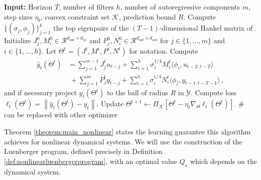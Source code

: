 \documentclass[11pt]{article}
\def\K{{\mathcal K}}
\def\R{{\mathcal R}}
\newcommand{\norm}[1]{\left\lVert#1\right\rVert}
\def\R{\ensuremath{\mathcal R}}
\numberwithin{equation}{section}
\begin{document}
\begin{algorithm}[htb]
\caption{Observation Spectral Filtering + Regression}
\label{alg:clsf_regressionmain}
\begin{algorithmic}[1]
\STATE \textbf{Input:} Horizon \(T\), number of filters \(h\), number of autoregressive components $m$, step sizes $\eta_t$, convex constraint set \(\K\), prediction bound $R$.
\STATE Compute $\{(\sigma_j, {\phi}_j)\}_{j=1}^k$ the top eigenpairs of the $(T-1)$-dimensional Hankel matrix of \cite{hazan2017learning}.
\STATE Initialize $J_j^0, M_i^0  \in \R^{d_{out} \times d_{in}}$ and $P_j^0, N_i^0  \in \R^{d_{out} \times d_{out}}$ for $j \in \{1, \ldots, m\}$ and $i\in\{1,\dots,h\}$. Let $\Theta^t = (J^t, M^t, P^t, N^t)$ for notation.
\STATE Compute \begin{align*}\hat{y}_t(\Theta^t) &= \sum_{j=1}^{m-1}J_j^tu_{t-j} +  \sum_{i=1}^h \sigma_i^{1/4}M_i^t \langle \phi_{i} ,  u_{t-2:t-T} \rangle \\ &\;+ \sum_{j=1}^{m}P_j^ty_{t-j} + \sum_{i=1}^h \sigma_i^{1/4}N_i^t \langle \phi_{j} ,  y_{t-1:t-T-1} \rangle\,, \end{align*}
and if necessary project $\hat{y}_t(\Theta^t)$ to the ball of radius $R$ in $\mathcal{Y}$.
\STATE Compute loss $\ell_t(\Theta^t) = \norm{\hat{y}_t(\Theta^t) - y_t}$.
\STATE Update $\Theta^{t+1} \leftarrow \Pi_\K\left[\Theta^t - \eta_t  \nabla_\Theta \ell_t(\Theta^t)\right]$. 
\hfill \textcolor[HTML]{408080}{\# can be replaced with other optimizer}
\ENDFOR
\end{algorithmic}
\end{algorithm}

Theorem \ref{theorem:main_nonlinear} states the learning guarantee this algorithm achieves for nonlinear dynamical systems. 
We will use the construction of the Luenberger program, defined precisely in Definition \ref{def:nonlinearluenbergerprogram}, with an optimal value $Q_\star$ which depends on the dynamical system.
\end{document}
